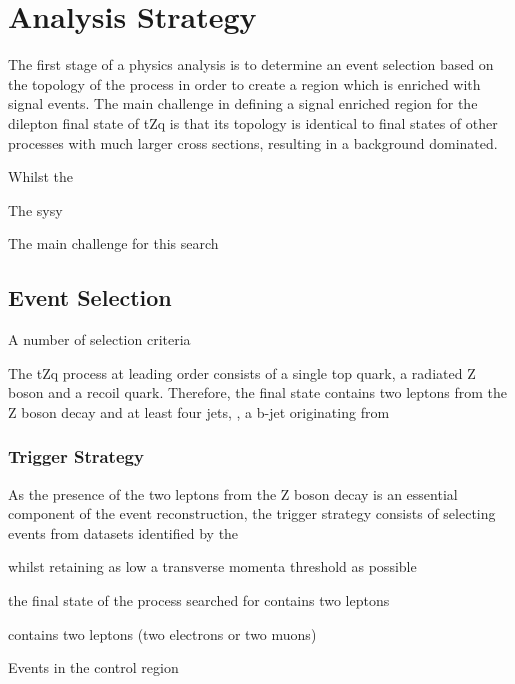 \chapter{Analysis Strategy }\label{chapter:tzq-search}

The first stage of a physics analysis is to determine an event selection based on the topology of the process in order to create a region which is enriched with signal events.
The main challenge in defining a signal enriched region for the dilepton final state of tZq is that its topology is identical to final states of other processes with much larger cross sections, resulting in a background dominated.

Whilst the 

The sysy


The main challenge for this search 


\section{Event Selection}\label{sec:signalRegion}
A number of selection criteria 


The tZq process at leading order consists of a single top quark, a radiated Z boson and a recoil quark.
Therefore, the final state contains two leptons from the Z boson decay and at least four jets, 
, a b-jet originating from 

\subsection{Trigger Strategy}
As the presence of the two leptons from the Z boson decay is an essential component of the event reconstruction, the trigger strategy consists of selecting events from datasets identified by the 

 whilst retaining as low a transverse momenta threshold as possible

the final state of the process searched for contains two leptons 

contains two leptons (\ie two electrons or two muons)

Events in the \ttbar control region 

